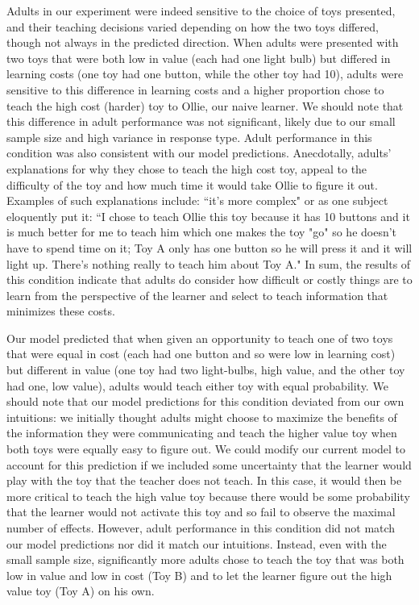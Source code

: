 \documentclass[10pt,letterpaper]{article}
\begin{document}
Adults in our experiment were indeed sensitive to the choice of toys presented, and their teaching decisions varied depending on how the two toys differed, though not always in the predicted direction. When adults were presented with two toys that were both low in value (each had one light bulb) but differed in learning costs (one toy had one button, while the other toy had 10), adults were sensitive to this difference in learning costs and a higher proportion chose to teach the high cost (harder) toy to Ollie, our naive learner. We should note that this difference in adult performance was not significant, likely due to our small sample size and high variance in response type. Adult performance in this condition was also consistent with our model predictions. Anecdotally, adults' explanations for why they chose to teach the high cost toy, appeal to the difficulty of the toy and how much time it would take Ollie to figure it out. Examples of such explanations include: ``it's more complex" or as one subject eloquently put it: ``I chose to teach Ollie this toy because it has 10 buttons and it is much better for me to teach him which one makes the toy "go" so he doesn't have to spend time on it; Toy A only has one button so he will press it and it will light up. There's nothing really to teach him about Toy A." In sum, the results of this condition indicate that adults do consider how difficult or costly things are to learn from the perspective of the learner and select to teach information that minimizes these costs. 

Our model predicted that when given an opportunity to teach one of two toys that were equal in cost (each had one button and so were low in learning cost) but different in value (one toy had two light-bulbs, high value, and the other toy had one, low value), adults would teach either toy with equal probability. We should note that our model predictions for this condition deviated from our own intuitions: we initially thought adults might choose to maximize the benefits of the information they were communicating and teach the higher value toy when both toys were equally easy to figure out. We could modify our current model to account for this prediction if we included some uncertainty that the learner would play with the toy that the teacher does not teach. In this case, it would then be more critical to teach the high value toy because there would be some probability that the learner would not activate this toy and so fail to observe the maximal number of effects. However, adult performance in this condition did not match our model predictions nor did it match our intuitions. Instead, even with the small sample size, significantly more adults chose to teach the toy that was both low in value and low in cost (Toy B) and to let the learner figure out the high value toy (Toy A) on his own. 
\end{document}
